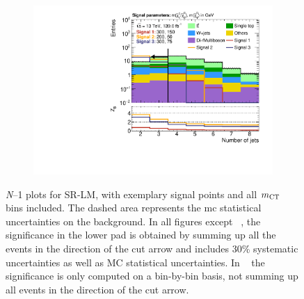 \begin{figure}
	\begin{subfigure}[b]{0.45\linewidth}
		\centering\includegraphics[width=\textwidth]{n1_SRLM_mct_bins/nJet30.pdf}
		\vspace{-2em}
		\caption{\label{fig:Wh_reopt_second_round_n1_srlm_njet}}
	\end{subfigure}
	\caption{\textit{N}--1 plots for SR-LM, with exemplary signal points and all $m_{\textrm{CT}}$ bins included. The dashed area represents the \gls{mc} statistical uncertainties on the background. In all figures except \figname~, the significance in the lower pad is obtained by summing up all the events in the direction of the cut arrow and includes 30\% systematic uncertainties as well as MC statistical uncertainties. In \figname~ the significance is only computed on a bin-by-bin basis, \ie not summing up all events in the direction of the cut arrow.}
	\label{fig:Wh_reopt_second_round_n1_srlm}
\end{figure}

